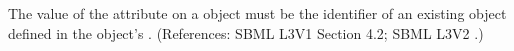 The value of the attribute  on a \Model object must
be the identifier of an existing \Parameter object defined in the \Model
object's \ListOfParameters.  (References: SBML L3V1 Section 4.2; SBML L3V2
.)
